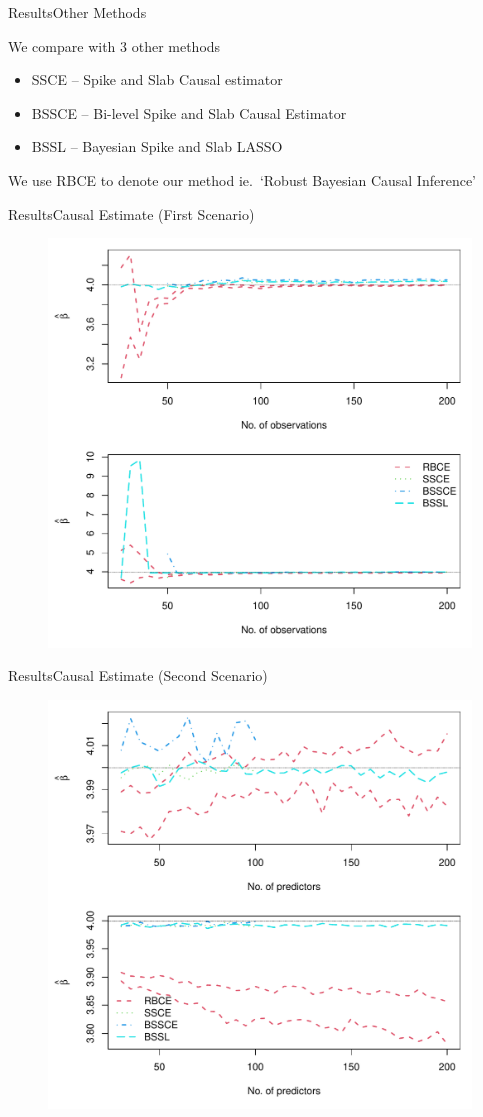 \documentclass[aspectratio=169]{beamer}					%
\begin{document}
\begin{frame}{Results}{Other Methods}

We compare with 3 other methods

\begin{itemize}
    \item SSCE -- Spike and Slab Causal estimator
    \item BSSCE -- Bi-level Spike and Slab Causal Estimator
    \item BSSL -- Bayesian Spike and Slab LASSO
\end{itemize}

\vspace{2em}
We use RBCE to denote our method ie.~`Robust Bayesian Causal Inference'

\end{frame}

\begin{frame}{Results}{Causal Estimate (First Scenario)}
\begin{figure}
    \centering
    \includegraphics[width = 0.5\linewidth]{treat_obs.pdf}
    \label{fig:comp:trt}
\end{figure}

\end{frame}

\begin{frame}{Results}{Causal Estimate (Second Scenario)}
\begin{figure}
    \centering
    \includegraphics[width = 0.5\linewidth]{treat_pred.pdf}
    \label{fig:comp:trt:pred}
\end{figure}
\end{frame}
\end{document}
